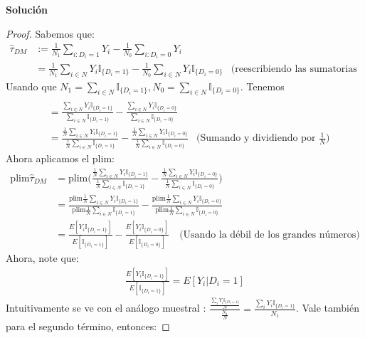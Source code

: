 \documentclass[a4paper, answers, addpoints, 11pt]{exam}
\newenvironment{solucion}{%
  \begin{mdframed}[
    backgroundcolor=blue!5,    %
    linecolor=blue!50,          %
    linewidth=2pt,              %
    leftmargin=10pt,            %
    rightmargin=8pt,           %
    topline=true,              %
    bottomline=true,            %
    roundcorner=10pt,           %
    innerleftmargin=10pt,       %
    innerrightmargin=10pt,      %
    innerbottommargin=10pt,     %
    innertopmargin=10pt         %
  ]%
  \begin{tcolorbox}[colframe=blue!50!black, colback=blue!50, coltitle=white, sharp corners=all, boxrule=1mm, width=\textwidth, halign=left, valign=center, top=0mm, bottom=0mm, left=0mm, right=0mm] \textbf{Solución} \end{tcolorbox} }{\end{mdframed}}
\begin{document}
\begin{itemize}
\begin{solucion}
        \begin{proof}
       Sabemos que:
        \begin{align*}
    \widehat{\tau}_{DM} &:= \frac{1}{N_1} \sum_{i: D_i=1} Y_i - \frac{1}{N_0} \sum_{i: D_i=0} Y_i \\&=
  \frac{1}{N_1} \sum_{i \in N} Y_i \mathbb{I}_{\{D_i=1\}} -\frac{1}{N_0} \sum_{i \in N} Y_i \mathbb{I}_{\{D_i=0\}}  &\text{(reescribiendo las sumatorias en términos de N)} 
  \end{align*}
  Usando que $N_1=\sum_{i \in N}  \mathbb{I}_{\{D_i=1\}}, N_0=\sum_{i \in N}  \mathbb{I}_{\{D_i=0\}}$. Tenemos
  \begin{align*}
  \\&=
   \frac{\sum_{i \in N} Y_i \mathbb{I}_{\{D_i=1\}}}{\sum_{i \in N}  \mathbb{I}_{\{D_i=1\}}}  -\frac{\sum_{i \in N} Y_i \mathbb{I}_{\{D_i=0\}}  }{\sum_{i \in N} \mathbb{I}_{\{D_i=0\}}} 
   \\&=
    \frac{\frac{1}{N}\sum_{i \in N} Y_i \mathbb{I}_{\{D_i=1\}}}{\frac{1}{N} \sum_{i \in N}  \mathbb{I}_{\{D_i=1\}}}  -\frac{\frac{1}{N}\sum_{i \in N} Y_i \mathbb{I}_{\{D_i=0\}}  }{\frac{1}{N}\sum_{i \in N} \mathbb{I}_{\{D_i=0\}}} &\text{(Sumando y dividiendo por $\frac{1}{N}$)} 
   \end{align*}
   Ahora aplicamos el plim:
  \begin{align*}
    \text{plim} \widehat{\tau}_{DM}&=  \text{plim} \bigg( \frac{\frac{1}{N}\sum_{i \in N} Y_i \mathbb{I}_{\{D_i=1\}}}{\frac{1}{N} \sum_{i \in N}  \mathbb{I}_{\{D_i=1\}}}  -\frac{\frac{1}{N}\sum_{i \in N} Y_i \mathbb{I}_{\{D_i=0\}}  }{\frac{1}{N}\sum_{i \in N} \mathbb{I}_{\{D_i=0\}}} \bigg) \\&=
     \frac{\text{plim}\frac{1}{N}\sum_{i \in N} Y_i \mathbb{I}_{\{D_i=1\}}}{\text{plim} \frac{1}{N} \sum_{i \in N}  \mathbb{I}_{\{D_i=1\}}}  -\frac{\text{plim}\frac{1}{N}\sum_{i \in N} Y_i \mathbb{I}_{\{D_i=0\}}  }{\text{plim}\frac{1}{N}\sum_{i \in N} \mathbb{I}_{\{D_i=0\}}}  \\&=
     \frac{E[ Y_i \mathbb{I}_{\{D_i=1\}}]}
     {E[\mathbb{I}_{\{D_i=1\}}] }  -\frac{E[ Y_i \mathbb{I}_{\{D_i=0\}}] }{E[\mathbb{I}_{\{D_i=0\}}]} \quad \text{(Usando la débil de los grandes números)} 
\end{align*}
Ahora, note que:
\begin{gather}\label{referenciar}
\frac{E[ Y_i \mathbb{I}_{\{D_i=1\}}]}
     {E[\mathbb{I}_{\{D_i=1\}}] }= E[ Y_i| D_i=1]
\end{gather}
 Intuitivamente se ve con el análogo muestral : $\frac{\frac{\sum_i Y_i \mathbb{I}_{\{D_i=1\}}}{N}}{\frac{N_1}{N}}=\frac{\sum_i Y_i \mathbb{I}_{\{D_i=1\}}}{N_1}$. Vale también para el segundo término, entonces:

\end{proof}
\end{solucion}
\end{itemize}
\end{document}
